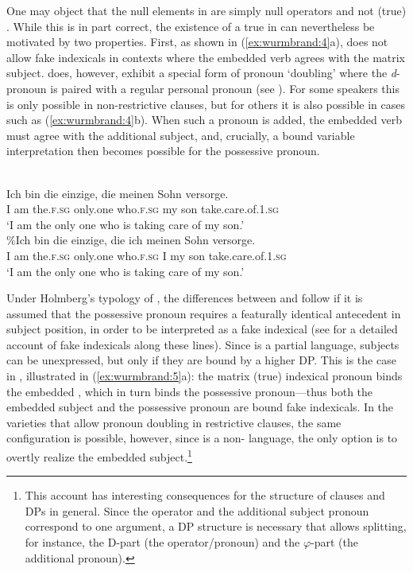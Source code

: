 \documentclass[output=paper]{LSP/langsci}
\begin{document}
One may object that the null elements in  are simply null  operators and not (true) . While this is in part correct, the existence of a true  in  can nevertheless be motivated by two properties. First, as shown in (\ref{ex:wurmbrand:4}a),  does not allow fake indexicals in contexts where the embedded verb agrees with the matrix subject.  does, however, exhibit a special form of  pronoun ‘doubling’ where the \textit{d}{}- pronoun is paired with a regular personal pronoun (see \citealt{ItoMester2000}). For some speakers this is only possible in non-restrictive  clauses, but for others it is also possible in cases such as (\ref{ex:wurmbrand:4}b). When such a pronoun is added, the embedded verb must agree with the additional subject, and, crucially, a bound variable interpretation then becomes possible for the possessive pronoun.

\ea  \label{ex:wurmbrand:4}
\ea
{}\\
\gll *Ich  bin  die einzige,  die  meinen Sohn  versorge.\\
I  am  the.\textsc{f.sg} only.one  who.\textsc{f.sg} my son  take.care.of.\textsc{1.sg}\\
\glt ‘I am the only one who is taking care of my son.’
\ex
{}\\
\gll \%Ich  bin  die einzige,  die  ich  meinen Sohn  versorge.\\
I  am  the.\textsc{f.sg} only.one  who.\textsc{f.sg}  I my son  take.care.of.\textsc{1.sg}\\
\glt  ‘I am the only one who is taking care of my son.’
\z
\z

Under Holmberg’s typology of , the differences between  and  follow if it is assumed that the possessive pronoun requires a featurally identical antecedent in subject position, in order to be interpreted as a fake indexical (see \citealt{Wurmbrand2015} for a detailed account of fake indexicals along these lines). Since  is a partial  language, subjects can be unexpressed, but only if they are bound by a higher DP. This is the case in , illustrated in (\ref{ex:wurmbrand:5}a): the matrix (true) indexical pronoun binds the embedded , which in turn binds the possessive pronoun—thus both the embedded subject and the possessive pronoun are bound fake indexicals. In the  varieties that allow  pronoun doubling in restrictive  clauses, the same configuration is possible, however, since  is a non- language, the only option is to overtly realize the embedded subject.\footnote{This account has interesting consequences for the structure of  clauses and DPs in general. Since the  operator and the additional subject pronoun correspond to one argument, a DP structure is necessary that allows splitting, for instance, the D-part (the  operator/pronoun) and the $\varphi $-part (the additional pronoun).}
\end{document}
